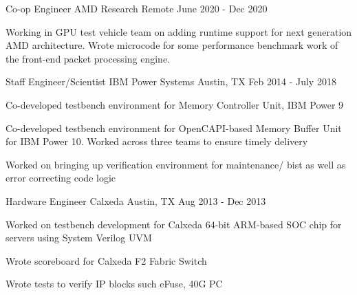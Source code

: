 
\begin{cventries}
  \cventry
    {Co-op Engineer} %
    {AMD Research} %
    {Remote} %
    { June 2020 - Dec 2020} %
    {
      \begin{cvitems} %
        \item {Working in GPU test vehicle team on adding runtime support for next generation AMD architecture. Wrote microcode for some performance benchmark work of the front-end packet processing engine.}
      \end{cvitems}
    }
  \cventry
    {Staff Engineer/Scientist} %
    {IBM Power Systems} %
    {Austin, TX} %
    {Feb 2014 - July 2018} %
    {
      \begin{cvitems} %
        \item {Co-developed testbench environment for Memory Controller Unit, IBM Power 9}
        \item {Co-developed testbench environment for OpenCAPI-based Memory Buffer Unit for IBM Power 10. Worked across three teams to ensure timely delivery}
        \item {Worked on bringing up verification environment for maintenance/ bist as well as error correcting code logic}
      \end{cvitems}
    }

  \cventry
    {Hardware Engineer} %
    {Calxeda} %
    {Austin, TX} %
    { Aug 2013 - Dec 2013} %
    {
      \begin{cvitems} %
        \item {Worked on testbench development for Calxeda 64-bit ARM-based SOC chip for servers using System Verilog UVM}
        \item {Wrote scoreboard for Calxeda F2 Fabric Switch}
        \item {Wrote tests to verify IP blocks such eFuse, 40G PC}
      \end{cvitems}
    }
\end{cventries}